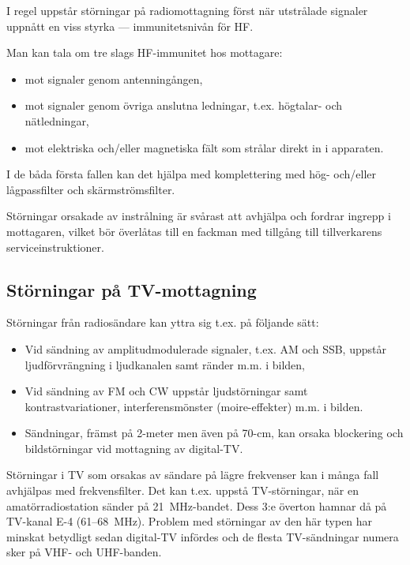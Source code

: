 I regel uppstår störningar på radiomottagning först när utstrålade signaler
uppnått en viss styrka --- immunitetsnivån för HF.

Man kan tala om tre slags HF-immunitet hos mottagare:
\begin{itemize}
\item mot signaler genom antenningången,
\item mot signaler genom övriga anslutna ledningar, t.ex. högtalar-
  och nätledningar,
\item mot elektriska och/eller magnetiska fält som strålar direkt in i
  apparaten.
\end{itemize}

I de båda första fallen kan det hjälpa med komplettering med hög- och/eller
lågpassfilter och skärmströmsfilter.

Störningar orsakade av instrålning är svårast att avhjälpa och fordrar ingrepp i
mottagaren, vilket bör överlåtas till en fackman med tillgång till
tillverkarens serviceinstruktioner.

\subsection{Störningar på TV-mottagning}


Störningar från radiosändare kan yttra sig t.ex. på följande sätt:
\begin{itemize}
\item Vid sändning av amplitudmodulerade signaler, t.ex. AM och SSB,
  uppstår ljudförvrängning i ljudkanalen samt ränder m.m. i bilden,
\item Vid sändning av FM och CW uppstår ljudstörningar samt
  kontrastvariationer, interferensmönster (moire-effekter) m.m. i
  bilden.
\item Sändningar, främst på 2-meter men även på 70-cm, kan orsaka blockering och
bildstörningar vid mottagning av digital-TV. 
\end{itemize}

Störningar i TV som orsakas av sändare på lägre frekvenser kan i många fall
avhjälpas med frekvensfilter. Det kan t.ex. uppstå TV-störningar, när en amatörradiostation sänder på 21~MHz-bandet. Dess 3:e överton hamnar då på
TV-kanal E-4 (61--68~MHz). Problem med störningar av den här typen har minskat
betydligt sedan digital-TV infördes och de flesta TV-sändningar numera sker på
VHF- och UHF-banden.

